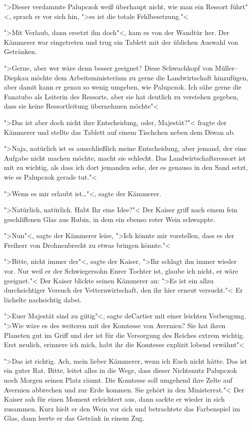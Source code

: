 ">Dieser verdammte Palupczok weiß überhaupt nicht, wie man ein Ressort führt"<, sprach er vor sich hin, ">es ist die totale Fehlbesetzung."<

">Mit Verlaub, dann ersetzt ihn doch"<, kam es von der Wandtür her. Der Kämmerer war eingetreten und trug ein Tablett mit der üblichen Auswahl von Getränken.

">Gerne, aber wer wäre denn besser geeignet? Diese Schwachkopf von Müller--Diepkau möchte dem Arbeitsministerium zu gerne die Landwirtschaft hinzufügen, aber damit kann er genau so wenig umgeben, wie Palupczok. Ich sähe gerne die Fanatubo als Leiterin des Ressorts, aber sie hat deutlich zu verstehen gegeben, dass sie keine Ressortleitung übernehmen möchte"<

">Das ist aber doch nicht ihre Entscheidung, oder, Majestät?"< fragte der Kämmerer und stellte das Tablett auf einem Tischchen neben dem Diwan ab.

">Naja, natürlich ist es ausschließlich meine Entscheidung, aber jemand, der eine Aufgabe nicht machen möchte, macht sie schlecht. Das Landwirtschaftsressort ist mit zu wichtig, als dass ich dort jemanden sehe, der es genauso in den Sand setzt, wie es Palupczok gerade tut."<

">Wenn es mir erlaubt ist\dots"<, sagte der Kämmerer.

">Natürlich, natürlich. Habt Ihr eine Idee?"< Der Kaiser griff nach einem fein geschliffenen Glas aus Rubin, in dem ein ebenso roter Wein schwappte.

">Nun"<, sagte der Kämmerer leise, ">Ich könnte mir vorstellen, dass es der Freiherr von Drohnenbrecht zu etwas bringen könnte."<

">Bitte, nicht immer der"<, sagte der Kaiser, ">Ihr schlagt ihn immer wieder vor. Nur weil er der Schwiegersohn Eurer Tochter ist, glaube ich nicht, er wäre geeignet."< Der Kaiser blickte seinen Kämmerer an: ">Es ist ein allzu durchsichtiger Versuch der Vetternwirtschaft, den ihr hier erneut versucht."< Er lächelte nachsichtig dabei.

">Euer Majestät sind zu gütig"<, sagte deCartier mit einer leichten Verbeugung. ">Wie wäre es des weiteren mit der Komtesse von Avernien? Sie hat ihren Planeten gut im Griff und der ist für die Versorgung des Reiches extrem wichtig. Erst neulich, erinnere ich mich, habt ihr die Komtesse explizit lobend erwähnt"<

">Das ist richtig. Ach, mein lieber Kämmerer, wenn ich Euch nicht hätte. Das ist ein guter Rat. Bitte, leitet alles in die Wege, dass dieser Nichtsnutz Palupczok noch Morgen seinen Platz räumt. Die Komtesse soll umgehend ihre Zelte auf Avernien abbrechen und zur Erde kommen. Sie gehört in den Ministerrat."< Der Kaiser sah für einen Moment erleichtert aus, dann sackte er wieder in sich zusammen. Kurz hielt er den Wein vor sich und betrachtete das Farbenspiel im Glas, dann leerte er das Getränk in einem Zug.

